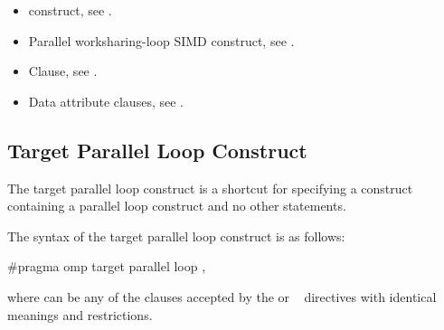 \crossreferences
\begin{itemize}
\item {} construct, see
.

\item Parallel worksharing-loop SIMD construct, see
.

\item {} Clause, see .

\item Data attribute clauses, see
.

\end{itemize}









\subsection{Target Parallel Loop Construct}
\label{subsec:Target Parallel Loop Construct}
\summary
The target parallel loop construct is a shortcut for specifying a  construct containing a parallel loop construct and no other statements.

\syntax
\begin{ccppspecific}
The syntax of the target parallel loop construct is as follows:

\begin{ompcPragma}
#pragma omp target parallel loop \plc{[clause[ [},\plc{] clause] ... ] new-line}
\end{ompcPragma}

where  can be any of the clauses accepted by the  or ~
directives with identical meanings and restrictions.
\end{ccppspecific}

